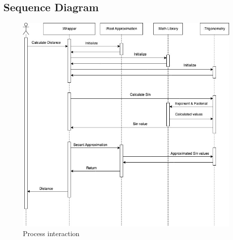 \documentclass{report}
\begin{document}
    \subsection{Sequence Diagram}
      \vspace{1cm}
      \begin{figure}[h!]
        \includegraphics[width=1\linewidth]{resources/sequence.jpeg}
        \vspace{.5cm}
        \caption{Process interaction}
        \label{fig:Sequence Diagram}
      \end{figure}
      \vspace{2cm}
\end{document}
